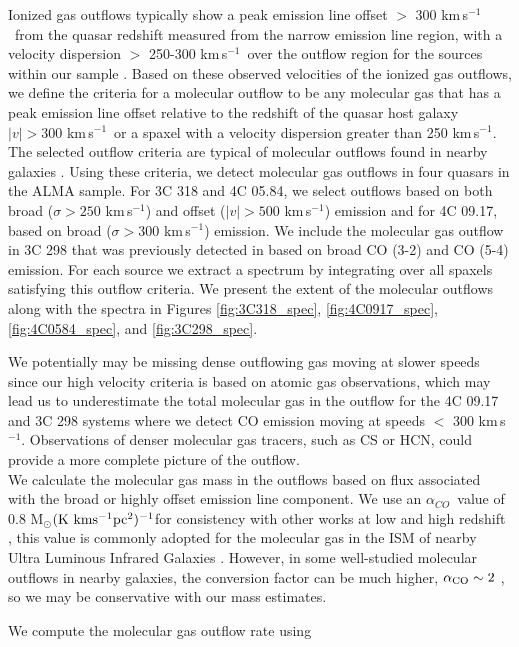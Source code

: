 \documentclass[twocolumn]{aastex63}
\newcommand{\msun}{M$_{\odot}$}
\newcommand{\kms}{km\,s$^{-1}$}
\newcommand{\alphaco}{$\alpha_{CO}$}
\newcommand{\alphacounits}{\msun$\rm(K~kms^{-1}pc^{2})^{-1}$}
\begin{document}
Ionized gas outflows typically show a peak emission line offset  $>$ 300 \kms\ from the quasar redshift measured from the narrow emission line region, with a velocity dispersion $>$ 250-300 \kms\ over the outflow region for the sources within our sample \citep{Vayner19b}. Based on these observed velocities of the ionized gas outflows, we define the criteria for a molecular outflow to be any molecular gas that has a peak emission line offset relative to the redshift of the quasar host galaxy $|v| >300$ \kms\ or a spaxel with a velocity dispersion greater than 250 \kms. The selected outflow criteria are typical of molecular outflows found in nearby galaxies \citep{Fluetsch19}. Using these criteria, we detect molecular gas outflows in four quasars in the ALMA sample. For 3C 318 and 4C 05.84, we select outflows based on both broad ($\sigma>250$ \kms) and offset ($|v| > 500$ \kms) emission and for 4C 09.17, based on broad ($\sigma>300$ \kms) emission. We include the molecular gas outflow in 3C 298 that was previously detected in \citet{Vayner17} based on broad CO (3-2) and CO (5-4) emission. For each source we extract a spectrum by integrating over all spaxels satisfying this outflow criteria. We present the extent of the molecular outflows along with the spectra in Figures \ref{fig:3C318_spec}, \ref{fig:4C0917_spec}, \ref{fig:4C0584_spec}, and \ref{fig:3C298_spec}. 

We potentially may be missing dense outflowing gas moving at slower speeds since our high velocity criteria is based on atomic gas observations, which may lead us to underestimate the total molecular gas in the outflow for the 4C 09.17 and 3C 298 systems where we detect CO emission moving at speeds $<$ 300 \kms. Observations of denser molecular gas tracers, such as CS or HCN, could provide a more complete picture of the outflow. \\

We calculate the molecular gas mass in the outflows based on flux associated with the broad or highly offset emission line component. We use an \alphaco\ value of 0.8 \alphacounits for consistency with other works at low and high redshift \citep{Herrera-Camus19,Fluetsch19}, this value is commonly adopted for the molecular gas in the ISM of nearby Ultra Luminous Infrared Galaxies \citep{Bolatto13}. However, in some well-studied molecular outflows in nearby galaxies, the conversion factor can be much higher, $\alpha_{\rm CO}\sim 2$ \citep{Cicone18}, so we may be conservative with our mass estimates.

We compute the molecular gas outflow rate using
\end{document}

